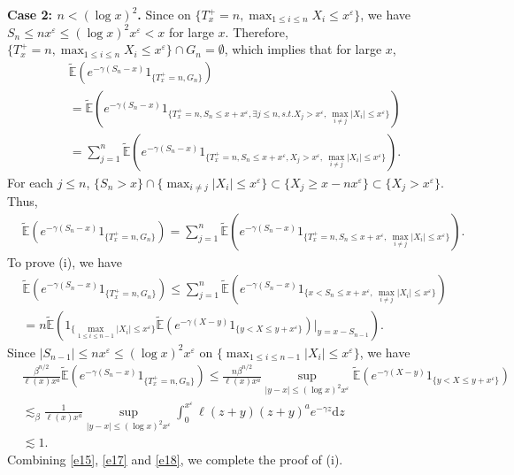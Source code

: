 \documentclass[11pt]{article}
\numberwithin{equation}{section}
\begin{document}
\noindent
{\bf Case 2: $n  <(\log x)^2$.}  Since on $\{T_x^+=n, \max_{1\leq i\leq n} X_i \leq x^{\varepsilon}\}$, we have  $S_n \leq n x^{\varepsilon}\leq (\log x)^2 x^{\varepsilon} <x$ for large $x$. Therefore, $\{T_x^+=n, \max_{1\leq i\leq n} X_i \leq x^{\varepsilon}\}\cap G_n=\emptyset$, which implies that for large $x$, 
\begin{align}\label{e13}
		  & \widetilde{\mathbb{E}}\left(e^{-\gamma (S_n-x)}1_{\{T_x^+=n, G_n\}}\right)  \nonumber\\
		  &= 	 \widetilde{\mathbb{E}}\left(e^{-\gamma (S_n-x)}1_{\{T_x^+=n, S_n\leq x+x^\varepsilon,  \exists   j\leq n, s.t. X_j>x^\varepsilon,\ \max_{i\neq j} |X_i| \leq x^{\varepsilon}  \}}\right) \nonumber\\
		  & = \sum_{j=1}^n  \widetilde{\mathbb{E}}\left(e^{-\gamma (S_n-x)}1_{\{T_x^+=n, S_n\leq x+x^\varepsilon,   X_j>x^\varepsilon,\ \max_{i\neq j} |X_i| \leq x^{\varepsilon}  \}}\right) .
\end{align}
For each $j\leq n$, $\{S_n>x\}\cap \{\max_{i\neq j} |X_i| \leq x^{\varepsilon}   \}\subset \{X_j \geq x- nx^\varepsilon\}\subset \{X_j >x^\varepsilon\}$. Thus,
\begin{align}\label{e16}
	  & \widetilde{\mathbb{E}}\left(e^{-\gamma (S_n-x)}1_{\{T_x^+=n, G_n\}}\right)   = \sum_{j=1}^n  \widetilde{\mathbb{E}}\left(e^{-\gamma (S_n-x)}1_{\{T_x^+=n, S_n\leq x+x^\varepsilon, \ \max_{i\neq j} |X_i| \leq x^{\varepsilon}  \}}\right) .
\end{align}
To prove (i),   we have 
\begin{align}
	  & \widetilde{\mathbb{E}}\left(e^{-\gamma (S_n-x)}1_{\{T_x^+=n, G_n\}}\right)   \leq \sum_{j=1}^n  \widetilde{\mathbb{E}}\left(e^{-\gamma (S_n-x)}1_{\{ x<S_n\leq x+x^\varepsilon, \ \max_{i\neq j} |X_i| \leq x^{\varepsilon}  \}}\right) \nonumber\\
	  & = n \widetilde{\mathbb{E}}\left(1_{\{ \max_{1\leq i\leq n-1} |X_i| \leq x^{\varepsilon}  \}} \widetilde{\mathbb{E}} \left(e^{-\gamma (X-y)}1_{\{ y< X\leq y+x^\varepsilon\}}\right)\Big|_{y=x-S_{n-1}}\right). 
\end{align}
Since $|S_{n-1}|\leq nx^\varepsilon \leq (\log x)^2 x^{\varepsilon} $ on $\{ \max_{1\leq i\leq n-1} |X_i| \leq x^{\varepsilon}  \}$, we have
\begin{align}\label{e18}
	& \frac{ \beta^{n/2}}{\ell(x) x^a} \widetilde{\mathbb{E}}\left(e^{-\gamma (S_n-x)}1_{\{T_x^+=n, G_n\}}\right) \leq 	 \frac{ n\beta^{n/2} }{\ell(x) x^a} \sup_{|y-x|\leq (\log x)^2 x^{\varepsilon}} \widetilde{\mathbb{E}} \left(e^{-\gamma (X-y)}1_{\{ y< X\leq y+x^\varepsilon\}}\right)\nonumber\\
	& \lesssim_\beta  \frac{  1}{\ell(x) x^a}\sup_{|y-x|\leq (\log x)^2 x^{\varepsilon}}  \int_0^{x^\varepsilon} \ell(z+y) (z+y)^a e^{-\gamma z}\mathrm{d}z \nonumber\\
	& \lesssim 1. 
\end{align}
Combining \eqref{e15}, \eqref{e17} and \eqref{e18}, we complete the proof of (i).
\end{document}
